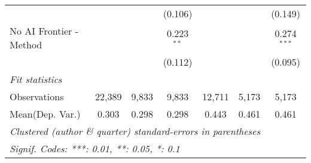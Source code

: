 \begin{tabular}{lcccccc}
                           &               &               & (0.106)       &               &               & (0.149)\\   
   No AI Frontier - Method &               &               & 0.223$^{**}$  &               &               & 0.274$^{***}$\\   
                           &               &               & (0.112)       &               &               & (0.095)\\   
   \midrule
   \emph{Fit statistics}\\
   Observations            & 22,389        & 9,833         & 9,833         & 12,711        & 5,173         & 5,173\\  
Mean(Dep. Var.) & 0.303 & 0.298 & 0.298 & 0.443 & 0.461 & 0.461 \\
   \midrule \midrule
   \multicolumn{7}{l}{\emph{Clustered (author \& quarter) standard-errors in parentheses}}\\
   \multicolumn{7}{l}{\emph{Signif. Codes: ***: 0.01, **: 0.05, *: 0.1}}\\
\end{tabular}
\par\endgroup
